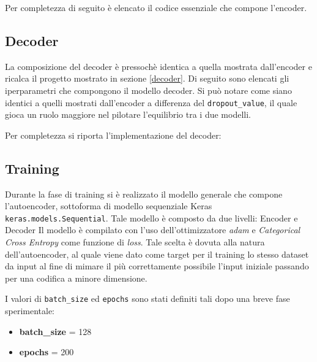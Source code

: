 Per completezza di seguito è elencato il codice essenziale che compone l'encoder.



\subsection{Decoder}
La composizione del decoder è pressochè identica a quella mostrata dall'encoder e ricalca il progetto mostrato in sezione \ref{decoder}. Di seguito sono elencati gli iperparametri che compongono il modello decoder. Si può notare come siano identici a quelli mostrati dall'encoder a differenza del \lstinline!dropout_value!, il quale gioca un ruolo maggiore nel pilotare l'equilibrio tra i due modelli.



Per completezza si riporta l'implementazione del decoder:



\subsection{Training}
Durante la fase di training si è realizzato il modello generale che compone l'autoencoder, sottoforma di modello sequenziale Keras \lstinline!keras.models.Sequential!. Tale modello è composto da due livelli: Encoder e Decoder
Il modello è compilato con l'uso dell'ottimizzatore \textit{adam} e \textit{Categorical Cross Entropy} come funzione di \textit{loss}. Tale scelta è dovuta alla natura dell'autoencoder, al quale viene dato come target per il training lo stesso dataset da input al fine di mimare il più correttamente possibile l'input iniziale passando per una codifica a minore dimensione.



I valori di \lstinline!batch_size! ed \lstinline!epochs! sono stati definiti tali dopo una breve fase sperimentale:
\begin{itemize}
\item \textbf{batch\_size} = 128 
\item \textbf{epochs} = 200
\end{itemize}

